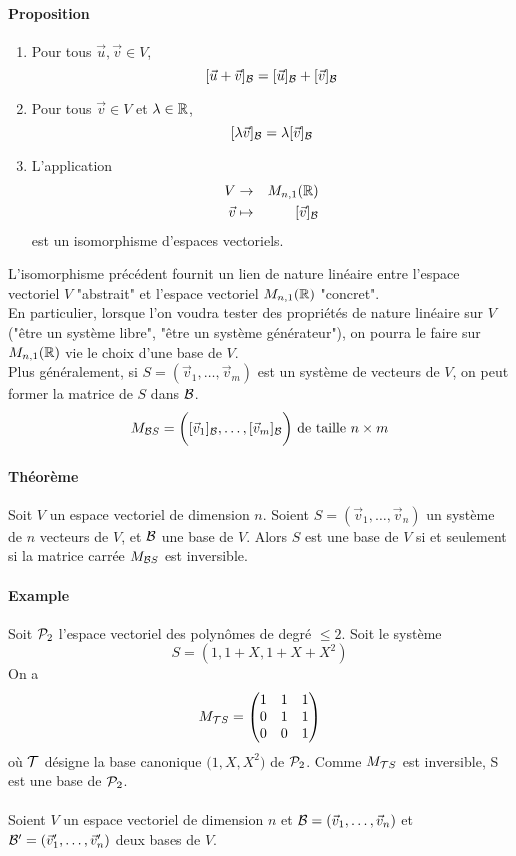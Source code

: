 {\paragraph{Proposition} 
\begin{enumerate}
  \item Pour tous $\vec{u}, \vec{v} \in V$, 
    $$[\vec{u} + \vec{v}]_{\mathcal{B}} = [\vec{u}]_{\mathcal{B}} + [\vec{v}]_{\mathcal{B}}$$
  \item Pour tous $\vec{v} \in V$ et $\lambda  \in \mathbb{R}$, 
    $$[\lambda \vec{v}]_{\mathcal{B}} = \lambda [\vec{v}]_{\mathcal{B}}$$
  \item L'application
    \begin{eqnarray*}
      V &\rightarrow& M_{n, 1}(\mathbb{R}) \\
      \vec{v} &\mapsto& [\vec{v}]_{\mathcal{B}}
    \end{eqnarray*}
    est un isomorphisme d'espaces vectoriels.
\end{enumerate}
L'isomorphisme précédent fournit un lien de nature linéaire entre l'espace vectoriel $V$ "abstrait" et l'espace vectoriel $M_{n, 1}(\mathbb{R})$ "concret". \\
En particulier, lorsque l'on voudra tester des propriétés de nature linéaire sur $V$ ("être un système libre", "être un système générateur"), on pourra le faire sur $M_{n, 1}(\mathbb{R})$ vie le choix d'une base de $V$. \\
Plus généralement, si $S=(\vec{v}_1, \ldots, \vec{v}_m)$ est un système de vecteurs de $V$, on peut former la matrice de $S$ dans $\mathcal{B}$.
$$M_{\mathcal{B} S} = \bigg( [\vec{v}_1]_{\mathcal{B}}, \ldots, [\vec{v}_m]_{\mathcal{B}} \bigg) \text{ de taille } n \times m$$

\paragraph{Théorème} Soit $V$ un espace vectoriel de dimension $n$. Soient $S = (\vec{v}_1, \ldots, \vec{v}_n)$ un système de $n$ vecteurs de $V$, et $\mathcal{B}$ une base de $V$. Alors $S$ est une base de $V$ si et seulement si la matrice carrée $M_{\mathcal{B} S}$ est inversible.

\paragraph{Example} Soit $\mathcal{P}_2$ l'espace vectoriel des polynômes de degré $\leq 2$. Soit le système
$$S = (1, 1 + X, 1 + X + X^2)$$
On a 
$$M_{\mathcal{T} S} = \begin{pmatrix}
  1 & 1 & 1 \\
  0 & 1 & 1 \\
  0 & 0 & 1
\end{pmatrix}$$
où $\mathcal{T}$ désigne la base canonique $\big(1, X, X^2 \big)$ de $\mathcal{P}_2$. Comme $M_{\mathcal{T} S}$ est inversible, S est une base de $\mathcal{P}_2$.
\\\\
Soient $V$ un espace vectoriel de dimension $n$ et $\mathcal{B} = (\vec{v}_1, \ldots, \vec{v}_n)$ et $\mathcal{B}' = (\vec{v}'_1, \ldots, \vec{v}'_n)$ deux bases de $V$.

}
